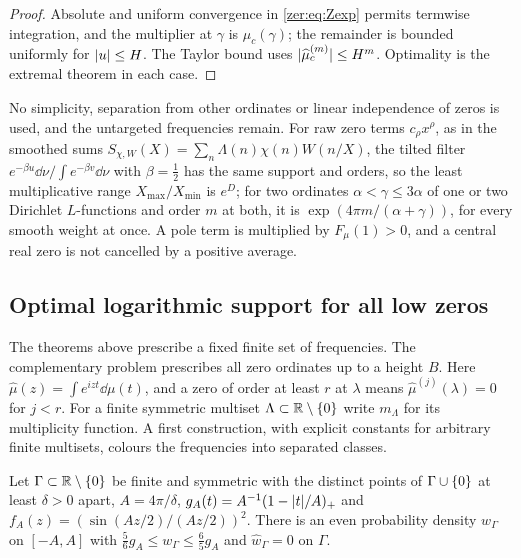 \begin{proof}
Absolute and uniform convergence in \eqref{zer:eq:Zexp} permits termwise integration, and the multiplier at
$\gamma$ is $\widehat\mu_c(\gamma)$; the remainder is bounded uniformly for $\lvert u\rvert\le H$. The Taylor bound
uses $\lvert\widehat\mu_c^{(m)}\rvert\le H^m$. Optimality is the extremal theorem in each case.
\end{proof}

No simplicity, separation from other ordinates or linear independence of zeros is used, and the
untargeted frequencies remain. For raw zero terms $c_\rho x^\rho$, as in the smoothed sums
$S_{\chi,W}(X)=\sum_n\Lambda(n)\chi(n)W(n/X)$, the tilted filter $e^{-\beta u}\dd\nu/\int e^{-\beta v}\dd\nu$
with $\beta=\tfrac12$ has the same support and orders, so the least multiplicative range
$X_{\max}/X_{\min}$ is $e^D$; for two ordinates $\alpha<\gamma\le3\alpha$ of one or two Dirichlet
$L$-functions and order $m$ at both, it is $\exp(4\pi m/(\alpha+\gamma))$, for every smooth weight at once.
A pole term is multiplied by $F_\mu(1)>0$, and a central real zero is not cancelled by a positive average.

\subsection{Optimal logarithmic support for all low zeros}\label{fil:sec:logsupport}

The theorems above prescribe a fixed finite set of frequencies. The complementary problem prescribes all
zero ordinates up to a height $B$. Here $\widehat\mu(z)=\int e^{izt}\dd\mu(t)$, and a zero of order at least
$r$ at $\lambda$ means $\widehat\mu^{(j)}(\lambda)=0$ for $j<r$. For a finite symmetric multiset
$\Lambda\subset\mathbb{R}\setminus\{0\}$ write $m_\Lambda$ for its multiplicity function. A first construction,
with explicit constants for arbitrary finite multisets, colours the frequencies into separated classes.

\begin{lemma}\label{rec:lem:sepfilter}
Let $\Gamma\subset\mathbb{R}\setminus\{0\}$ be finite and symmetric with the distinct points of $\Gamma\cup\{0\}$ at least $\delta>0$
apart, $A=4\pi/\delta$, $g_A(t)=A^{-1}(1-\lvert t\rvert/A)_+$ and $f_A(z)=(\sin(Az/2)/(Az/2))^2$. There is an even
probability density $w_\Gamma$ on $[-A,A]$ with $\tfrac56g_A\le w_\Gamma\le\tfrac65g_A$ and $\widehat w_\Gamma=0$ on $\Gamma$.
\end{lemma}

